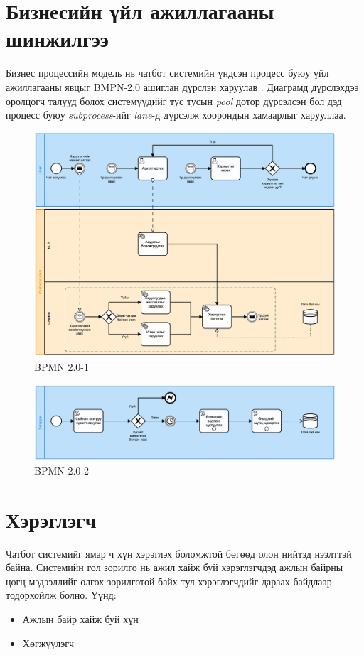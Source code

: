 \section{Бизнесийн үйл ажиллагааны шинжилгээ}
Бизнес процессийн модель нь чатбот системийн үндсэн процесс буюу үйл ажиллагааны явцыг BMPN-2.0 ашиглан дүрслэн харуулав \cite{BPMN}. Диаграмд дүрслэхдээ оролцогч талууд болох системүүдийг тус тусын \textit{pool} дотор дүрсэлсэн бол дэд процесс буюу \textit{subprocess}-ийг \textit{lane}-д дүрсэлж хоорондын хамаарлыг харууллаа. 
\begin{figure}[h]
  \centering
  \includegraphics*[width=\textwidth]{images/bpmn1.png}
  \caption{BPMN 2.0-1}
  \label{fig:bpmn1}
\end{figure}
\begin{figure}[h]
  \centering
  \includegraphics*[width=\textwidth]{images/bpmn2.png}
  \caption{BPMN 2.0-2}
  \label{fig:bpmn1}
\end{figure}
\section{Хэрэглэгч}
Чатбот системийг ямар ч хүн хэрэглэх боломжтой бөгөөд олон нийтэд нээлттэй байна. Системийн гол зорилго нь ажил хайж буй хэрэглэгчдэд ажлын байрны цогц мэдээллийг олгох зорилготой байх тул хэрэглэгчдийг дараах байдлаар тодорхойлж болно. Үүнд:
\begin{itemize}
  \item Ажлын байр хайж буй хүн
  \item Хөгжүүлэгч
\end{itemize}
